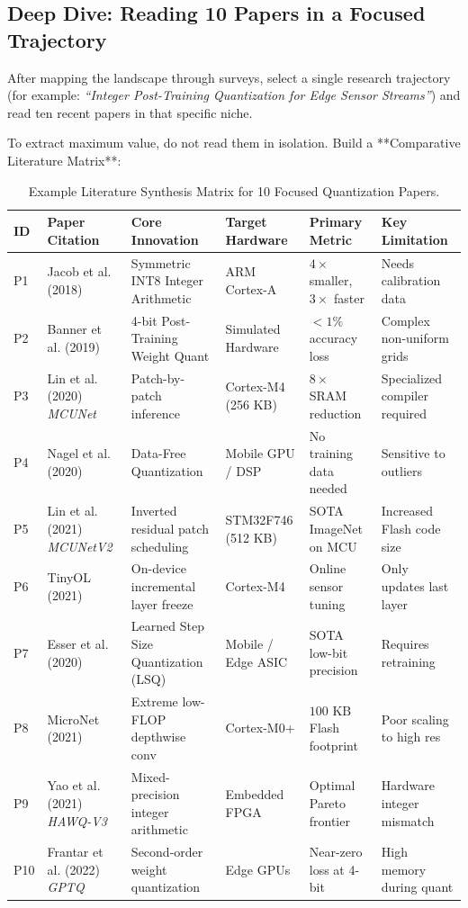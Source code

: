 \subsection{Deep Dive: Reading 10 Papers in a Focused Trajectory}

After mapping the landscape through surveys, select a single research trajectory (for example: \textit{``Integer Post-Training Quantization for Edge Sensor Streams''}) and read ten recent papers in that specific niche.

To extract maximum value, do not read them in isolation. Build a **Comparative Literature Matrix**:

\begin{table}[htbp]
\centering
\scriptsize
\begin{tabular}{lp{2.4cm}p{2.6cm}p{2.4cm}p{2.6cm}p{2.2cm}}
\toprule
\textbf{ID} & \textbf{Paper Citation} & \textbf{Core Innovation} & \textbf{Target Hardware} & \textbf{Primary Metric} & \textbf{Key Limitation} \\
\midrule
P1 & Jacob et al. (2018) & Symmetric INT8 Integer Arithmetic & ARM Cortex-A & $4\times$ smaller, $3\times$ faster & Needs calibration data \\
P2 & Banner et al. (2019) & 4-bit Post-Training Weight Quant & Simulated Hardware & $< 1\%$ accuracy loss & Complex non-uniform grids \\
P3 & Lin et al. (2020) \textit{MCUNet} & Patch-by-patch inference & Cortex-M4 (256 KB) & $8\times$ SRAM reduction & Specialized compiler required \\
P4 & Nagel et al. (2020) & Data-Free Quantization & Mobile GPU / DSP & No training data needed & Sensitive to outliers \\
P5 & Lin et al. (2021) \textit{MCUNetV2} & Inverted residual patch scheduling & STM32F746 (512 KB) & SOTA ImageNet on MCU & Increased Flash code size \\
P6 & TinyOL (2021) & On-device incremental layer freeze & Cortex-M4 & Online sensor tuning & Only updates last layer \\
P7 & Esser et al. (2020) & Learned Step Size Quantization (LSQ) & Mobile / Edge ASIC & SOTA low-bit precision & Requires retraining \\
P8 & MicroNet (2021) & Extreme low-FLOP depthwise conv & Cortex-M0+ & $100\text{ KB}$ Flash footprint & Poor scaling to high res \\
P9 & Yao et al. (2021) \textit{HAWQ-V3} & Mixed-precision integer arithmetic & Embedded FPGA & Optimal Pareto frontier & Hardware integer mismatch \\
P10 & Frantar et al. (2022) \textit{GPTQ} & Second-order weight quantization & Edge GPUs & Near-zero loss at 4-bit & High memory during quant \\
\bottomrule
\end{tabular}
\caption{Example Literature Synthesis Matrix for 10 Focused Quantization Papers.}\label{tab:lit_matrix}
\end{table}

